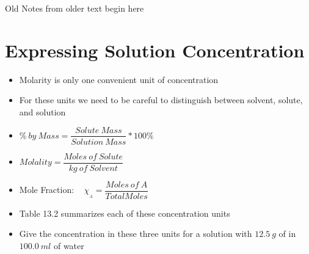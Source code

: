 \documentclass[12pt, openany, letterpaper]{memoir}
\begin{document}
{\HUGE Old Notes from older text begin here}

\section{Expressing Solution Concentration}
\begin{itemize}
	\item Molarity is only one convenient unit of concentration
	\item For these units we need to be careful to distinguish between solvent, solute, and solution
	\item $\%~by~Mass = \dfrac{Solute~Mass}{Solution~Mass}*100\%$
	\item $Molality = \dfrac{Moles~of~Solute}{kg~of~Solvent}$
	\item Mole Fraction: ~  $\chi_{_A}=\dfrac{Moles~of~A}{Total Moles}$
	\item Table 13.2 summarizes each of these concentration units
	\item Give the concentration in these three units for a solution with $12.5~g$ of  in $100.0~ml$ of water
\end{itemize}
\end{document}
